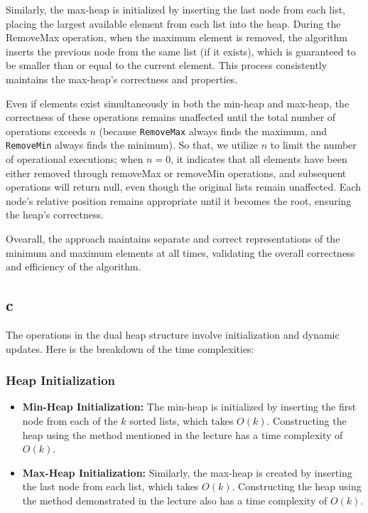 \documentclass[12pt]{article}
\begin{document}
        Similarly, the max-heap is initialized by inserting the last node from each list, placing the largest available element from each list into the heap. During the RemoveMax operation, when the maximum element is removed, the algorithm inserts the previous node from the same list (if it exists), which is guaranteed to be smaller than or equal to the current element. This process consistently maintains the max-heap's correctness and properties.

        Even if elements exist simultaneously in both the min-heap and max-heap, the correctness of these operations remains unaffected until the total number of operations exceeds $n$ (because \texttt{RemoveMax} always finds the maximum, and \texttt{RemoveMin} always finds the minimum). So that, we utilize \( n \) to limit the number of operational executions; when \( n = 0 \), it indicates that all elements have been either removed through removeMax or removeMin operations, and subsequent operations will return null, even though the original lists remain unaffected. Each node's relative position remains appropriate until it becomes the root, ensuring the heap's correctness.

        Ovearall, the approach maintains separate and correct representations of the minimum and maximum elements at all times, validating the overall correctness and efficiency of the algorithm.


    \subsection*{c}

    The operations in the dual heap structure involve initialization and dynamic updates. Here is the breakdown of the time complexities:

    \subsubsection*{Heap Initialization}
    \begin{itemize}
        \item \textbf{Min-Heap Initialization:} The min-heap is initialized by inserting the first node from each of the $k$ sorted lists, which takes $O(k)$. Constructing the heap using the method mentioned in the lecture has a time complexity of $O(k)$.
        \item \textbf{Max-Heap Initialization:}  Similarly, the max-heap is created by inserting the last node from each list, which takes $O(k)$. Constructing the heap using the method demonstrated in the lecture also has a time complexity of $O(k)$.
    \end{itemize}
\end{document}
